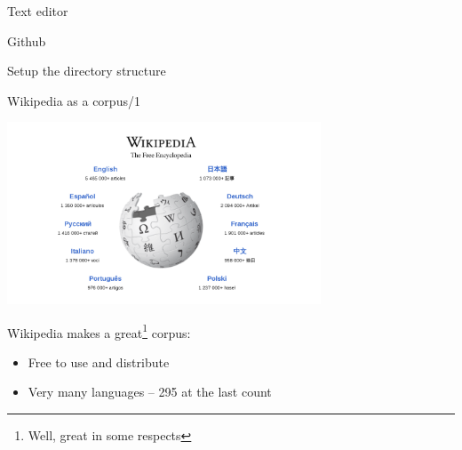 \documentclass[10pt, compress]{beamer}
\begin{document}
\begin{frame}{Text editor}



\end{frame}

\begin{frame}{Github}

\end{frame}


\begin{frame}{Setup the directory structure}

\end{frame}

\begin{frame}{Wikipedia as a corpus/1}

\begin{center}
\includegraphics[width=0.70\textwidth]{graphics/wikipedia-front.png}
\end{center}

Wikipedia makes a great\footnote{Well, great in some respects} corpus:

\begin{itemize}
   \item Free to use and distribute
   \item Very many languages -- 295 at the last count
\end{itemize}

\end{frame}
\end{document}
